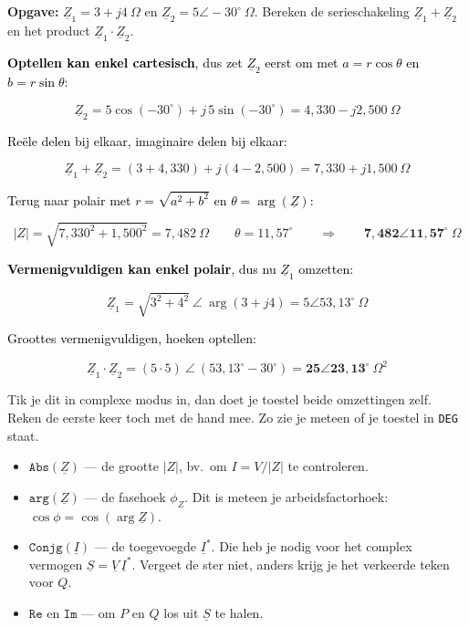 \documentclass[a4paper,11pt]{article}
\newcommand{\stapreden}[1]{\par\vspace{1.4mm}\noindent\textcolor{black}{#1}\par\vspace{-2mm}}
\begin{document}
\begin{voorbeeld}
    \textbf{Opgave:} $\underline{Z}_1 = 3 + j4\ \Omega$ en $\underline{Z}_2 = 5\angle -30^\circ\ \Omega$.
    Bereken de serieschakeling $\underline{Z}_1 + \underline{Z}_2$ en het product
    $\underline{Z}_1 \cdot \underline{Z}_2$.

    \stapreden{\textbf{Optellen kan enkel cartesisch}, dus zet $\underline{Z}_2$ eerst om met
        $a = r\cos\theta$ en $b = r\sin\theta$:}
    \[\underline{Z}_2 = 5\cos(-30^\circ) + j\,5\sin(-30^\circ) = 4{,}330 - j2{,}500\ \Omega\]

    \stapreden{Re\"ele delen bij elkaar, imaginaire delen bij elkaar:}
    \[\underline{Z}_1 + \underline{Z}_2 = (3 + 4{,}330) + j(4 - 2{,}500) = 7{,}330 + j1{,}500\ \Omega\]

    \stapreden{Terug naar polair met $r = \sqrt{a^2+b^2}$ en $\theta = \arg(\underline{Z})$:}
    \[|Z| = \sqrt{7{,}330^2 + 1{,}500^2} = 7{,}482\ \Omega \qquad \theta = 11{,}57^\circ
        \qquad\Longrightarrow\qquad \mathbf{7{,}482\angle 11{,}57^\circ}\ \Omega\]

    \stapreden{\textbf{Vermenigvuldigen kan enkel polair}, dus nu $\underline{Z}_1$ omzetten:}
    \[\underline{Z}_1 = \sqrt{3^2+4^2}\ \angle\ \arg(3+j4) = 5\angle 53{,}13^\circ\ \Omega\]

    \stapreden{Groottes vermenigvuldigen, hoeken optellen:}
    \[\underline{Z}_1 \cdot \underline{Z}_2 = (5 \cdot 5)\ \angle\ (53{,}13^\circ - 30^\circ)
        = \mathbf{25\angle 23{,}13^\circ}\ \Omega^2\]

    Tik je dit in complexe modus in, dan doet je toestel beide omzettingen zelf. Reken de eerste keer
    toch met de hand mee. Zo zie je meteen of je toestel in \texttt{DEG} staat.
\end{voorbeeld}

\begin{theorie}
    \begin{itemize}
        \item $\texttt{Abs}(\underline{Z})$ --- de grootte $|Z|$, bv.\ om $I = V/|Z|$ te controleren.
        \item $\texttt{arg}(\underline{Z})$ --- de fasehoek $\phi_Z$. Dit is meteen je
              arbeidsfactorhoek: $\cos\phi = \cos(\arg \underline{Z})$.
        \item $\texttt{Conjg}(\underline{I})$ --- de toegevoegde $\underline{I}^{*}$. Die heb je nodig voor
              het complex vermogen $\underline{S} = \underline{V}\,\underline{I}^{*}$. Vergeet de
              ster niet, anders krijg je het verkeerde teken voor $Q$.
        \item $\texttt{Re}$ en $\texttt{Im}$ --- om $P$ en $Q$ los uit $\underline{S}$ te halen.
    \end{itemize}
\end{theorie}
\end{document}
